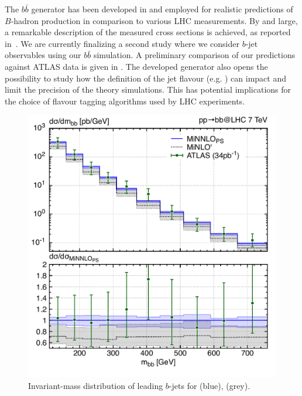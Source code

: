 \documentclass{FBR_Bericht_2025}
\begin{document}
\begin{refsection}
The $b\bar b$ \minnlo{} generator has been developed in  and employed for 
realistic predictions of $B$-hadron production in comparison to various LHC measurements.
By and large, a remarkable description of the measured cross sections is achieved, as reported in~. 
We are currently finalizing a second study where we 
consider $b$-jet observables using our $b\bar b$ \minnlo{} simulation.
%
A preliminary comparison of our \minnlo{} predictions against ATLAS data is given in 
.
%
The developed generator also opens the possibility to study how the definition of the jet flavour (e.g. ) can impact and limit the precision of the theory simulations.
This has potential implications for the choice of flavour tagging algorithms used by LHC experiments.
%


\begin{figure}[t]
\begin{center}
\includegraphics[width=0.95\linewidth]{plots/bjet_mbb.pdf}
\caption{Invariant-mass distribution of leading $b$-jets for \minnlo{} (blue), \minlo{} (grey).}
\label{fig:bb}
\end{center}
\end{figure}
%

\end{refsection}
\end{document}
